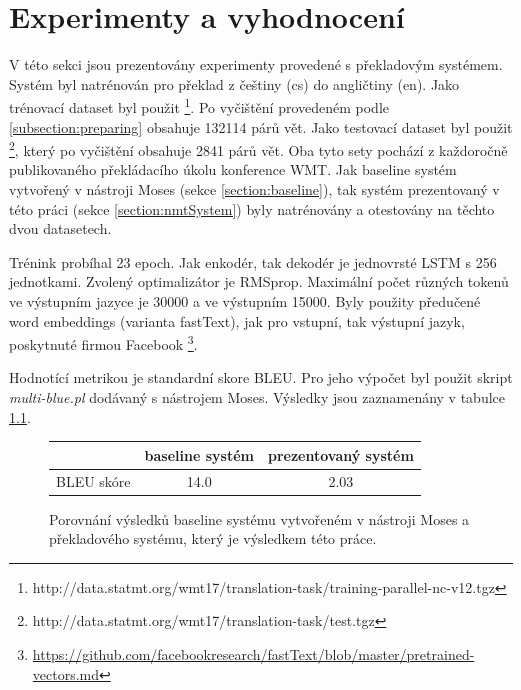 
\chapter{Experimenty a vyhodnocení} \label{chapter:results}
V této sekci jsou prezentovány experimenty provedené s překladovým systémem. Systém byl natrénován pro překlad z češtiny (cs) do angličtiny (en). Jako trénovací dataset byl použit \footnote{http://data.statmt.org/wmt17/translation-task/training-parallel-nc-v12.tgz}. Po vyčištění provedeném podle \ref{subsection:preparing} obsahuje 132114 párů vět. Jako testovací dataset byl použit \footnote{http://data.statmt.org/wmt17/translation-task/test.tgz}, který po vyčištění obsahuje 2841 párů vět. Oba tyto sety pochází z každoročně publikovaného překládacího úkolu konference WMT. Jak baseline systém vytvořený v nástroji Moses (sekce \ref{section:baseline}), tak systém prezentovaný v této práci (sekce \ref{section:nmtSystem}) byly natrénovány a otestovány na těchto dvou datasetech.

Trénink probíhal 23 epoch. Jak enkodér, tak dekodér je jednovrsté LSTM s 256 jednotkami. Zvolený optimalizátor je RMSprop. Maximální počet různých tokenů ve výstupním jazyce je 30000 a ve výstupním 15000. Byly použity předučené word embeddings (varianta fastText), jak pro vstupní, tak výstupní jazyk, poskytnuté firmou Facebook \footnote{\url{https://github.com/facebookresearch/fastText/blob/master/pretrained-vectors.md}}.

Hodnotící metrikou je standardní skore BLEU. Pro jeho výpočet byl použit skript \emph{multi-blue.pl} dodávaný s nástrojem Moses. Výsledky jsou zaznamenány v tabulce \ref{table:results}.




\begin{figure}[H]
    \begin{center}
        \begin{tabular}{c|c|c}
          & baseline systém & prezentovaný systém \\
          \hline
          BLEU skóre & 14.0 & 2.03\\
          \hline
        \end{tabular}
    \end{center}
	\caption{Porovnání výsledků baseline systému vytvořeném v nástroji Moses a překladového systému, který je výsledkem této práce.}
	\label{table:results}
\end{figure}

